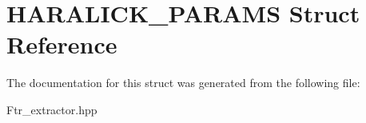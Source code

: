 \hypertarget{struct_h_a_r_a_l_i_c_k___p_a_r_a_m_s}{\section{H\+A\+R\+A\+L\+I\+C\+K\+\_\+\+P\+A\+R\+A\+M\+S Struct Reference}
\label{struct_h_a_r_a_l_i_c_k___p_a_r_a_m_s}
}


The documentation for this struct was generated from the following file\+:\begin{DoxyCompactItemize}
\item 
Ftr\+\_\+extractor.\+hpp\end{DoxyCompactItemize}
